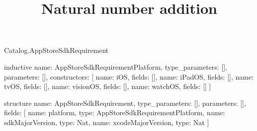\begin{lexlean}{Catalog.AppStoreSdkRequirement}
\title{Natural number addition}
\begin{semanticmodule}
inductive{
  name: AppStoreSdkRequirementPlatform,
  type_parameters: [],
  parameters: [],
  constructors: [
    {name: iOS, fields: []},
    {name: iPadOS, fields: []},
    {name: tvOS, fields: []},
    {name: visionOS, fields: []},
    {name: watchOS, fields: []}
  ]
}

structure{
  name: AppStoreSdkRequirement,
  type_parameters: [],
  parameters: [],
  fields: [
    {name: platform, type: AppStoreSdkRequirementPlatform},
    {name: sdkMajorVersion, type: Nat},
    {name: xcodeMajorVersion, type: Nat}
  ]
}
\end{semanticmodule}
\end{lexlean}
